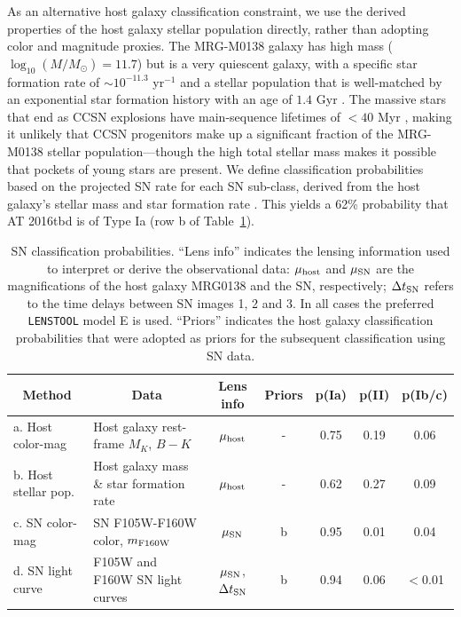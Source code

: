 \documentclass[12pt]{article}
\def\SNABC{AT 2016tbd\xspace}
\def\lenstool{{\tt LENSTOOL}\xspace}
\begin{document}
As an alternative host galaxy classification constraint, we use the derived properties of the host galaxy stellar population directly,  rather than adopting color and magnitude proxies. The MRG-M0138 galaxy has high mass ($\log_{10}(M/M_{\odot})=11.7$) but is a very quiescent galaxy, with a specific star formation rate of $\sim10^{-11.3}$ yr$^{-1}$  and a stellar population that is well-matched by an exponential star formation history with an age of $1.4$ Gyr \cite{newman_resolving_2018}. 
The massive stars that end as CCSN explosions have main-sequence lifetimes of $<40$ Myr \cite{smartt_progenitors_2009},  making it unlikely that CCSN progenitors make up a significant fraction of the MRG-M0138 stellar population---though the high total stellar mass makes it possible that pockets of young stars are present.  We define classification probabilities based on the projected SN rate for each SN sub-class, derived from the host galaxy's stellar mass and star formation rate \cite{li_rates_2012}.  This yields a 62\% probability that \SNABC is of Type Ia (row b of Table~\ref{tab:classification}).

\begin{table}[tb]
    \centering
    \begin{tabular}{lp{1.5in}cc|ccc}
        \multicolumn{1}{c}{Method} & \multicolumn{1}{c}{Data} & Lens info & Priors & p(Ia) & p(II) & p(Ib/c) \\
        \midrule
        a. Host color-mag & Host galaxy rest-frame $M_K$, $B-K$ & $\mu_{\rm host}$ & - & 0.75 & 0.19 & 0.06\\
        b. Host stellar pop. & Host galaxy mass \& star formation rate & $\mu_{\rm host}$ & - & 0.62 & 0.27 & 0.09 \\
        c. SN color-mag & SN F105W-F160W color, $m_{\rm F160W}$ & $\mu_{\rm SN}$ & b & 0.95 & 0.01 & 0.04\\
        d. SN light curve & F105W and F160W SN light curves & $\mu_{\rm SN}$, $\Delta t_{\rm SN}$ & b & 0.94 & 0.06 & $<$0.01 \\
    \end{tabular}
    \caption{SN classification probabilities. ``Lens info'' indicates the lensing information used to interpret or derive the 
    observational data: $\mu_{\rm host}$ and $\mu_{\rm SN}$ are the magnifications of the host galaxy MRG0138 and the SN, respectively; $\Delta t_{\rm SN}$ refers to the time delays between SN images 1, 2 and 3. In all cases the preferred \lenstool model E is used.  ``Priors'' indicates the host galaxy classification probabilities that were adopted as priors for the subsequent classification using SN data.}
    \label{tab:classification}
\end{table}
\end{document}
